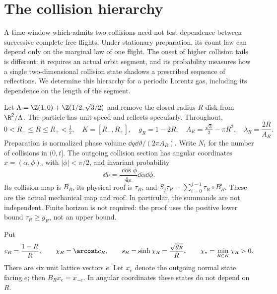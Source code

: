 \section{The collision hierarchy}
\label{sec:results}
A time window which admits two collisions need not test dependence between
successive complete free flights. Under stationary preparation, its count
law can depend only on the marginal law of one flight. The onset of higher
collision tails is different: it requires an actual orbit segment, and its
probability measures how a single two-dimensional collision state shadows
a prescribed sequence of reflections. We determine this hierarchy for a
periodic Lorentz gas, including its dependence on the length of the segment.

Let $\Lambda=\Z(1,0)+\Z(1/2,\sqrt3/2)$ and remove the closed radius-$R$
disk from $\R^2/\Lambda$. The particle has unit speed and reflects
specularly. Throughout,
\begin{equation}\label{eq:parameters}
 0<R_-\le R\le R_+<\tfrac12,\quad K=[R_-,R_+],\quad
 g_R=1-2R,\quad A_R=\tfrac{\sqrt3}{2}-\pi R^2,\quad
 \lambda_R=\frac{2R}{A_R}.
\end{equation}
Preparation is normalized phase volume $\dd q\dd\vartheta/(2\pi A_R)$.
Write $N_t$ for the number of collisions in $(0,t]$. The outgoing collision
section has angular coordinates $x=(\alpha,\phi)$, with
$|\phi|<\pi/2$, and invariant probability
\begin{equation}\label{eq:nu}
 \dd\nu=\frac{\cos\phi}{4\pi}\dd\alpha\dd\phi.
\end{equation}
Its collision map is $B_R$, its physical roof is $\tau_R$, and
$S_j\tau_R=\sum_{i=0}^{j-1}\tau_R\circ B_R^i$. These are the actual
mechanical map and roof. In particular, the summands are not independent.
Finite horizon is not required: the proof uses the positive lower bound
$\tau_R\ge g_R$, not an upper bound.

Put
\begin{equation}\label{eq:chi}
 c_R=\frac{1-R}{R},\qquad
 \chi_R=\arcosh c_R,\qquad s_R=\sinh\chi_R=\frac{\sqrt{g_R}}{R},
 \qquad \chi_* =\min_{R\in K}\chi_R>0.
\end{equation}
There are six unit lattice vectors $e$. Let $x_e$ denote the outgoing
normal state facing $e$; then $B_Rx_e=x_{-e}$. In angular coordinates
these states do not depend on $R$.

